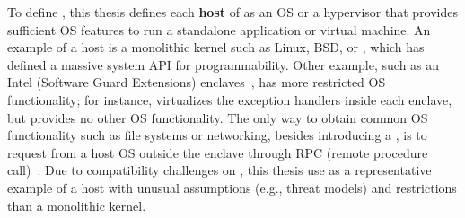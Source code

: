 





 
To define \thehostabi{},
this thesis defines
each {\bf host} of \thehostabi{}
as an OS or a hypervisor
that provides sufficient OS features to run a standalone application
or virtual machine.
An example of a host is a monolithic kernel
such as Linux, BSD, or \win{},
which has defined a massive system API for programmability.
Other example,
such as an Intel \sgx{} (Software Guard Extensions) enclaves~\cite{intelsgx},
has more restricted OS functionality;
for instance, \sgx{} virtualizes the exception handlers
inside each enclave, but provides no other OS functionality. The only way to obtain common OS functionality such as file systems or networking,
besides introducing a \libos{},
is to request from a host OS outside the enclave
through RPC (remote procedure call)~\cite{checkoway13iago,osdi16scone}.
Due to compatibility challenges
on \sgx{}, this thesis use \sgx{} as a representative example of a host
with unusual assumptions (e.g., threat models) and restrictions
than a monolithic kernel.

